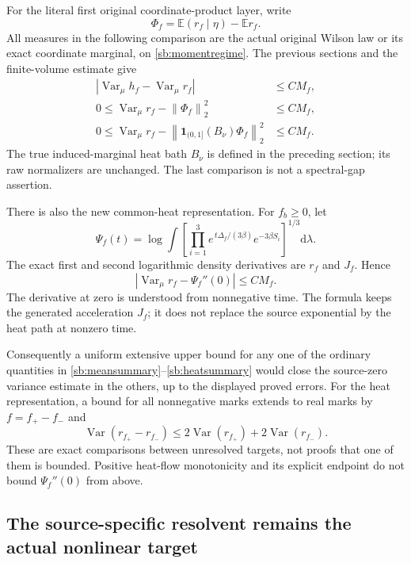 \documentclass[11pt]{article}
\theoremstyle{definition}\newtheorem{definition}[theorem]{Definition}
\theoremstyle{remark}\newtheorem{remark}[theorem]{Remark}
\newcommand{\E}{\mathbb E}\newcommand{\Var}{\operatorname{Var}}
\newcommand{\dd}{\mathrm d}\newcommand{\id}{\mathrm{id}}
\newcommand{\norm}[1]{\left\lVert #1\right\rVert}
\begin{document}
For the literal first original coordinate-product layer, write
\[
 \Phi_f=\E(r_f\mid\eta)-\E r_f.
\]
All measures in the following comparison are the actual original Wilson law or its exact coordinate marginal, on \eqref{sb:momentregime}. The previous sections and the finite-volume estimate give
\begin{align}
 \left|\Var_\mu h_f-\Var_\mu r_f\right|&\le CM_f,
       \label{sb:contactsummary}\\
 0\le\Var_\mu r_f-\norm{\Phi_f}_2^2&\le CM_f,
       \label{sb:meansummary}\\
 0\le\Var_\mu r_f
       -\norm{\mathbf1_{(0,1]}(B_\nu)\Phi_f}_2^2&\le CM_f.
       \label{sb:lowsummary}
\end{align}
The true induced-marginal heat bath \(B_\nu\) is defined in the preceding section; its raw normalizers are unchanged. The last comparison is not a spectral-gap assertion.

There is also the new common-heat representation. For \(f_b\ge0\), let
\[
 \Psi_f(t)=\log\int
     \left[\prod_{i=1}^3
       e^{\,t\Delta_f/(3\beta)}e^{-3\beta S_i}
     \right]^{1/3}\dd\lambda.
\]
The exact first and second logarithmic density derivatives are \(r_f\) and \(J_f\). Hence
\begin{equation}
 \left|\Var_\mu r_f-\Psi_f''(0)\right|\le CM_f.
 \label{sb:heatsummary}
\end{equation}
The derivative at zero is understood from nonnegative time. The formula keeps the generated acceleration \(J_f\); it does not replace the source exponential by the heat path at nonzero time.

Consequently a uniform extensive upper bound for any one of the ordinary quantities in \eqref{sb:meansummary}--\eqref{sb:heatsummary} would close the source-zero variance estimate in the others, up to the displayed proved errors. For the heat representation, a bound for all nonnegative marks extends to real marks by \(f=f_+-f_-\) and
\[
 \Var(r_{f_+}-r_{f_-})
 \le2\Var(r_{f_+})+2\Var(r_{f_-}).
\]
These are exact comparisons between unresolved targets, not proofs that one of them is bounded. Positive heat-flow monotonicity and its explicit endpoint do not bound \(\Psi_f''(0)\) from above.

\subsection{The source-specific resolvent remains the actual nonlinear target}
\end{document}
